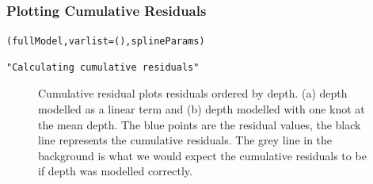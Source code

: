 \begin{frame}[fragile]
\frametitle{Plotting Cumulative Residuals}
\begin{knitrout}\footnotesize
{}\color{fgcolor}\begin{kframe}
\begin{alltt}
(fullModel, varlist= (), splineParams)
\end{alltt}
\begin{verbatim}
"Calculating cumulative residuals"
\end{verbatim}
\end{kframe}
\end{knitrout}

\begin{figure}[h]
  \centering
  \hfill
\caption{Cumulative residual plots residuals ordered by depth. (a) depth modelled as a linear term and (b) depth modelled with one knot at the mean depth.  The blue points are the residual values, the black line represents the cumulative residuals. The grey line in the background is what we would expect the cumulative residuals to be if depth was modelled correctly.}
\label{fig:cumres1}
\end{figure}
\end{frame}

